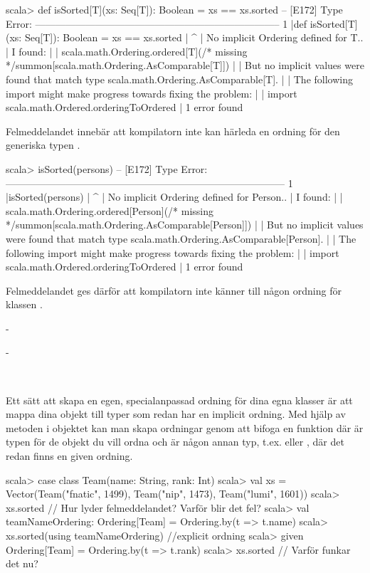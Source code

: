 \SubtaskSolved 
\begin{REPLnonum}
scala> def isSorted[T](xs: Seq[T]): Boolean = xs == xs.sorted
-- [E172] Type Error: --------------------------------------------------------------------------
1 |def isSorted[T](xs: Seq[T]): Boolean = xs == xs.sorted
  |                                                      ^
  | No implicit Ordering defined for T..
  | I found:
  |
  |     scala.math.Ordering.ordered[T](/* missing */summon[scala.math.Ordering.AsComparable[T]])
  |
  | But no implicit values were found that match type scala.math.Ordering.AsComparable[T].
  |
  | The following import might make progress towards fixing the problem:
  |
  |     import scala.math.Ordered.orderingToOrdered
  |
1 error found
\end{REPLnonum}
Felmeddelandet innebär att kompilatorn inte kan härleda en ordning för den generiska typen .

\SubtaskSolved 
\begin{REPLnonum}
scala> isSorted(persons)
-- [E172] Type Error: ------------------------------------------------------------------------------------
1 |isSorted(persons)
  |                 ^
  | No implicit Ordering defined for Person..
  | I found:
  |
  |     scala.math.Ordering.ordered[Person](/* missing */summon[scala.math.Ordering.AsComparable[Person]])
  |
  | But no implicit values were found that match type scala.math.Ordering.AsComparable[Person].
  |
  | The following import might make progress towards fixing the problem:
  |
  |     import scala.math.Ordered.orderingToOrdered
  |
1 error found
\end{REPLnonum}
Felmeddelandet ges därför att kompilatorn inte känner till någon ordning för klassen . 

\SubtaskSolved
-

\SubtaskSolved
-

\QUESTEND







\QUESTBEGIN

\Task \label{task:custom-ordering} \what~

\Subtask Ett sätt att skapa en egen, specialanpassad ordning för dina egna klasser är att mappa dina objekt till typer som redan har en implicit ordning. Med hjälp av metoden  i objektet  kan man skapa ordningar genom att bifoga en funktion  där  är typen för de objekt du vill ordna och  är någon annan typ, t.ex.  eller , där det redan finns en given ordning.
\begin{REPL}
scala> case class Team(name: String, rank: Int)
scala> val xs =
         Vector(Team("fnatic", 1499), Team("nip", 1473), Team("lumi", 1601))
scala> xs.sorted  // Hur lyder felmeddelandet? Varför blir det fel?
scala> val teamNameOrdering: Ordering[Team] = Ordering.by(t => t.name)
scala> xs.sorted(using teamNameOrdering)   //explicit ordning
scala> given Ordering[Team] = Ordering.by(t => t.rank)
scala> xs.sorted   // Varför funkar det nu?
\end{REPL}

